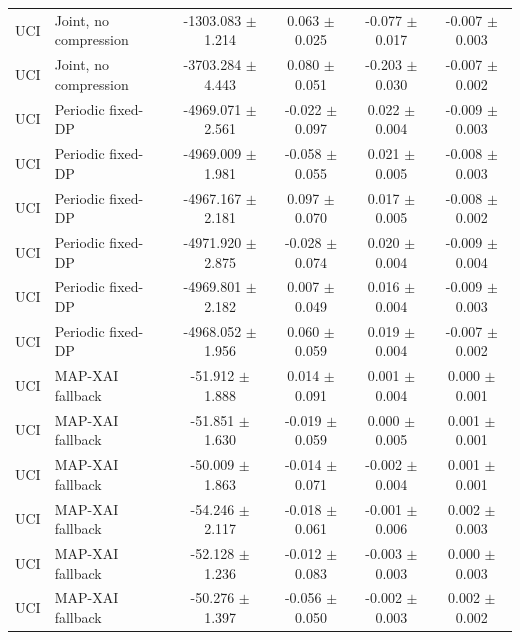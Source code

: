 \begin{tabular}{llcccc}
UCI & Joint, no compression & -1303.083 $\pm$ 1.214 & 0.063 $\pm$ 0.025 & -0.077 $\pm$ 0.017 & -0.007 $\pm$ 0.003 \\
UCI & Joint, no compression & -3703.284 $\pm$ 4.443 & 0.080 $\pm$ 0.051 & -0.203 $\pm$ 0.030 & -0.007 $\pm$ 0.002 \\
UCI & Periodic fixed-DP & -4969.071 $\pm$ 2.561 & -0.022 $\pm$ 0.097 & 0.022 $\pm$ 0.004 & -0.009 $\pm$ 0.003 \\
UCI & Periodic fixed-DP & -4969.009 $\pm$ 1.981 & -0.058 $\pm$ 0.055 & 0.021 $\pm$ 0.005 & -0.008 $\pm$ 0.003 \\
UCI & Periodic fixed-DP & -4967.167 $\pm$ 2.181 & 0.097 $\pm$ 0.070 & 0.017 $\pm$ 0.005 & -0.008 $\pm$ 0.002 \\
UCI & Periodic fixed-DP & -4971.920 $\pm$ 2.875 & -0.028 $\pm$ 0.074 & 0.020 $\pm$ 0.004 & -0.009 $\pm$ 0.004 \\
UCI & Periodic fixed-DP & -4969.801 $\pm$ 2.182 & 0.007 $\pm$ 0.049 & 0.016 $\pm$ 0.004 & -0.009 $\pm$ 0.003 \\
UCI & Periodic fixed-DP & -4968.052 $\pm$ 1.956 & 0.060 $\pm$ 0.059 & 0.019 $\pm$ 0.004 & -0.007 $\pm$ 0.002 \\
UCI & MAP-XAI fallback & -51.912 $\pm$ 1.888 & 0.014 $\pm$ 0.091 & 0.001 $\pm$ 0.004 & 0.000 $\pm$ 0.001 \\
UCI & MAP-XAI fallback & -51.851 $\pm$ 1.630 & -0.019 $\pm$ 0.059 & 0.000 $\pm$ 0.005 & 0.001 $\pm$ 0.001 \\
UCI & MAP-XAI fallback & -50.009 $\pm$ 1.863 & -0.014 $\pm$ 0.071 & -0.002 $\pm$ 0.004 & 0.001 $\pm$ 0.001 \\
UCI & MAP-XAI fallback & -54.246 $\pm$ 2.117 & -0.018 $\pm$ 0.061 & -0.001 $\pm$ 0.006 & 0.002 $\pm$ 0.003 \\
UCI & MAP-XAI fallback & -52.128 $\pm$ 1.236 & -0.012 $\pm$ 0.083 & -0.003 $\pm$ 0.003 & 0.000 $\pm$ 0.003 \\
UCI & MAP-XAI fallback & -50.276 $\pm$ 1.397 & -0.056 $\pm$ 0.050 & -0.002 $\pm$ 0.003 & 0.002 $\pm$ 0.002 \\
\bottomrule
\end{tabular}

